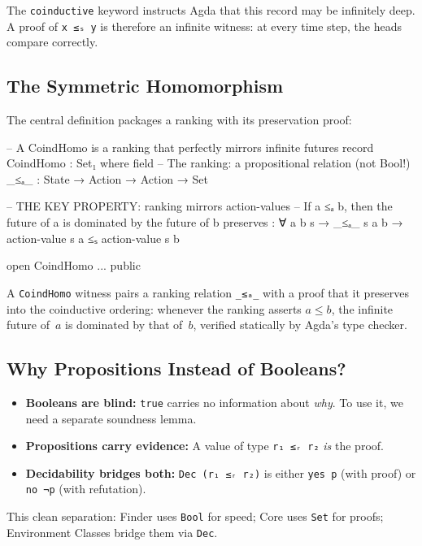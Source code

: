 \documentclass[9pt,a4paper]{article}
\theoremstyle{plain}
\theoremstyle{definition}
\theoremstyle{remark}
\begin{document}
\noindent The \texttt{coinductive} keyword instructs Agda that this record may be infinitely deep.  A proof of \texttt{x ≤ₛ y} is therefore an infinite witness: at every time step, the heads compare correctly.

\subsection{The Symmetric Homomorphism}

The central definition packages a ranking with its preservation proof:

\begin{code}
  -- A CoindHomo is a ranking that perfectly mirrors infinite futures
  record CoindHomo : Set₁ where
    field
      -- The ranking: a propositional relation (not Bool!)
      _≤ₐ_      : State → Action → Action → Set

      -- THE KEY PROPERTY: ranking mirrors action-values
      -- If a ≤ₐ b, then the future of a is dominated by the future of b
      preserves : ∀ a b s → _≤ₐ_ s a b →
                  action-value s a ≤ₛ action-value s b

  open CoindHomo {{...}} public
\end{code}

\noindent A \texttt{CoindHomo} witness pairs a ranking relation \texttt{\_≤ₐ\_} with a proof that it preserves into the coinductive ordering: whenever the ranking asserts $a \le b$, the infinite future of~$a$ is dominated by that of~$b$, verified statically by Agda's type checker.

\subsection{Why Propositions Instead of Booleans?}\label{sec:props-vs-bools}

\begin{itemize}
\item \textbf{Booleans are blind:} \texttt{true} carries no information about \emph{why}. To use it, we need a separate soundness lemma.
\item \textbf{Propositions carry evidence:} A value of type \texttt{r₁ ≤ᵣ r₂} \emph{is} the proof.
\item \textbf{Decidability bridges both:} \texttt{Dec (r₁ ≤ᵣ r₂)} is either \texttt{yes p} (with proof) or \texttt{no ¬p} (with refutation).
\end{itemize}

This clean separation: Finder uses \texttt{Bool} for speed; Core uses \texttt{Set} for proofs; Environment Classes bridge them via \texttt{Dec}.
\end{document}
